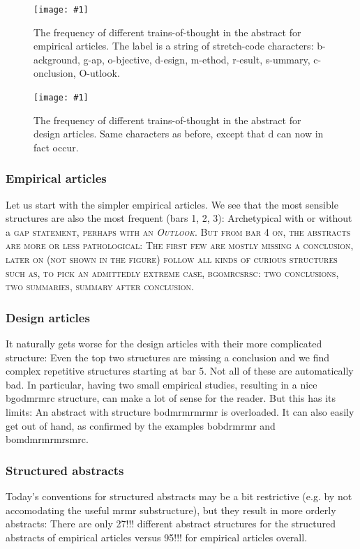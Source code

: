 \documentclass[10pt,journal,compsoc]{IEEEtran}
\newcommand{\Plot}[2]{%
	\begin{figure}[htb]%
		\centering\texttt{[image: \#1]}%
		\vspace{-4mm}\caption{#2}\label{#1}%
	\end{figure}}
\newcommand{\Cb}[1]{\bgroup\scshape #1\egroup}  %
\begin{document}
\Plot{ab_topicstructure_freqs_empir}{%
  The frequency of different trains-of-thought in the abstract for empirical articles.
  The label is a string of stretch-code characters:
  b-ackground, g-ap, o-bjective, d-esign, m-ethod, r-esult, s-ummary, c-onclusion, O-utlook.}
\Plot{ab_topicstructure_freqs_design}{%
  The frequency of different trains-of-thought in the abstract for design articles.
  Same characters as before, except that d can now in fact occur.}

\subsubsection{Empirical articles}

Let us start with the simpler empirical articles.
We see that the most sensible structures are also the most frequent (bars 1, 2, 3):
Archetypical with or without a \Cb{gap} statement, perhaps with an \emph{Outlook}.
But from bar 4 on, the abstracts are more or less pathological:
The first few are mostly missing a conclusion, later on (not shown in the figure)
follow all kinds of curious structures such as, to pick an admittedly extreme case,
bgomrcsrsc: two conclusions, two summaries, summary after conclusion.

\subsubsection{Design articles}

It naturally gets worse for the design articles with their more complicated structure:
Even the top two structures are missing a conclusion
and we find complex repetitive structures starting at bar 5.
Not all of these are automatically bad. 
In particular, having two small empirical studies, resulting in a nice bgodmrmrc structure,
can make a lot of sense for the reader.
But this has its limits: An abstract with structure bodmrmrmrmr is overloaded.
It can also easily get out of hand, as confirmed by the examples bobdrmrmr and bomdmrmrmrsmrc.

\subsubsection{Structured abstracts}

Today's conventions for structured abstracts may be a bit restrictive
(e.g. by not accomodating the useful mrmr substructure), 
but they result in more orderly abstracts:
There are only 27!!! different abstract structures for the structured abstracts of empirical articles
versus 95!!! for empirical articles overall.
\end{document}
